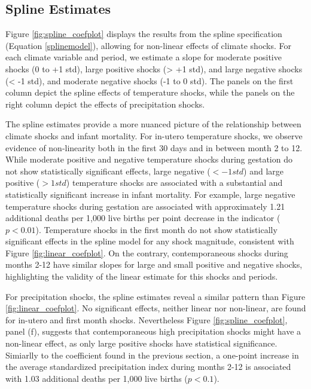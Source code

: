 \documentclass[a4paper]{article}
\begin{document}
% 

\subsection{Spline Estimates}


Figure \ref{fig:spline_coefplot} displays the results from the spline specification (Equation \ref{splinemodel}), allowing for non-linear effects of climate shocks.  For each climate variable and period, we estimate a slope for moderate positive shocks (0 to +1 std), large positive shocks (> +1 std), and large negative shocks (< -1 std), and moderate negative shocks (-1 to 0 std). The panels on the first column depict the spline effects of temperature shocks, while the panels on the right column depict the effects of precipitation shocks.

The spline estimates provide a more nuanced picture of the relationship between climate shocks and infant mortality.  For in-utero temperature shocks, we observe evidence of non-linearity both in the first 30 days and in between month 2 to 12.  While moderate positive and negative temperature shocks during gestation do not show statistically significant effects, large negative ($<-1std$) and large positive ($>1 std$) temperature shocks are associated with a substantial and statistically significant increase in infant mortality. For example, large negative temperature shocks during gestation are associated with approximately 1.21 additional deaths per 1,000 live births per point decrease in the indicator ($p < 0.01$). Temperature shocks in the first month do not show statistically significant effects in the spline model for any shock magnitude, consistent with Figure \ref{fig:linear_coefplot}. On the contrary, contemporaneous shocks during months 2-12 have similar slopes for large and small positive and negative shocks, highlighting the validity of the linear estimate for this shocks and periods.

For precipitation shocks, the spline estimates reveal a similar pattern than Figure \ref{fig:linear_coefplot}. No significant effects, neither linear nor non-linear, are found for in-utero and first month shocks. Nevertheless Figure \ref{fig:spline_coefplot}, panel (f), suggests that contemporaneous high precipitation shocks might have a non-linear effect, as only large positive shocks have statistical significance. Simiarlly to the coefficient found in the previous section,  a one-point increase in the average standardized precipitation index during months 2-12 is associated with 1.03 additional deaths per 1,000 live births ($p < 0.1$).
\end{document}

